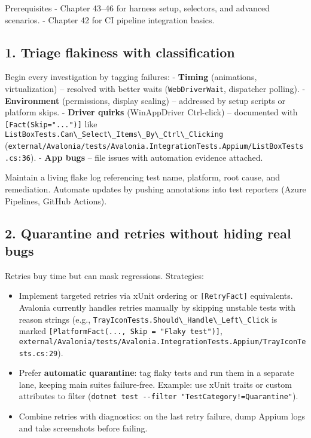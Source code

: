 Prerequisites - Chapter 43--46 for harness setup, selectors, and
advanced scenarios. - Chapter 42 for CI pipeline integration basics.

\subsection{1. Triage flakiness with
classification}\label{triage-flakiness-with-classification}

Begin every investigation by tagging failures: - \textbf{Timing}
(animations, virtualization) -- resolved with better waits
(\passthrough{\lstinline!WebDriverWait!}, dispatcher polling). -
\textbf{Environment} (permissions, display scaling) -- addressed by
setup scripts or platform skips. - \textbf{Driver quirks} (WinAppDriver
Ctrl-click) -- documented with
\passthrough{\lstinline![Fact(Skip="...")]!} like
\passthrough{\lstinline!ListBoxTests.Can\_Select\_Items\_By\_Ctrl\_Clicking!}
(\passthrough{\lstinline!external/Avalonia/tests/Avalonia.IntegrationTests.Appium/ListBoxTests.cs:36!}).
- \textbf{App bugs} -- file issues with automation evidence attached.

Maintain a living flake log referencing test name, platform, root cause,
and remediation. Automate updates by pushing annotations into test
reporters (Azure Pipelines, GitHub Actions).

\subsection{2. Quarantine and retries without hiding real
bugs}\label{quarantine-and-retries-without-hiding-real-bugs}

Retries buy time but can mask regressions. Strategies:

\begin{itemize}
\tightlist
\item
  Implement targeted retries via xUnit ordering or
  \passthrough{\lstinline![RetryFact]!} equivalents. Avalonia currently
  handles retries manually by skipping unstable tests with reason
  strings (e.g.,
  \passthrough{\lstinline!TrayIconTests.Should\_Handle\_Left\_Click!} is
  marked
  \passthrough{\lstinline![PlatformFact(..., Skip = "Flaky test")]!},
  \passthrough{\lstinline!external/Avalonia/tests/Avalonia.IntegrationTests.Appium/TrayIconTests.cs:29!}).
\item
  Prefer \textbf{automatic quarantine}: tag flaky tests and run them in
  a separate lane, keeping main suites failure-free. Example: use xUnit
  traits or custom attributes to filter
  (\passthrough{\lstinline'dotnet test --filter "TestCategory!=Quarantine"'}).
\item
  Combine retries with diagnostics: on the last retry failure, dump
  Appium logs and take screenshots before failing.
\end{itemize}

